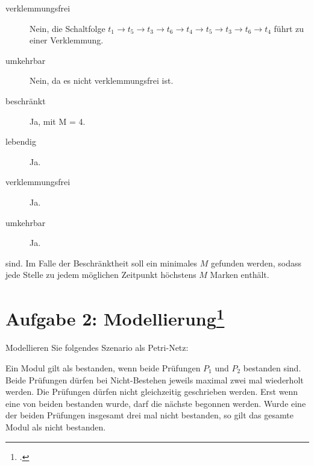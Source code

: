\documentclass{lehramt-informatik-haupt}
\begin{document}
\begin{antwort}
\begin{description}
\item[verklemmungsfrei] Nein, die Schaltfolge $t_1 \rightarrow t_5
\rightarrow t_3 \rightarrow t_6 \rightarrow t_4 \rightarrow t_5
\rightarrow t_3 \rightarrow t_6 \rightarrow t_4$ führt zu einer
Verklemmung.

\item[umkehrbar] Nein, da es nicht verklemmungsfrei ist.

\end{description}

\tikzset{/petri/.cd,x=3.3,y=4.3,scale=0.45}

\noindent
{}


\begin{description}
\item[beschränkt] Ja, mit M = 4.

\item[lebendig] Ja.

\item[verklemmungsfrei] Ja.

\item[umkehrbar] Ja.
\end{description}

\end{antwort}

\noindent
sind.
%
Im Falle der Beschränktheit soll ein minimales $M$ gefunden werden,
sodass jede Stelle zu jedem möglichen Zeitpunkt höchstens $M$ Marken
enthält.

%

\section{Aufgabe 2: Modellierung\footcite[Seite 2]{sosy:ab:4}}

Modellieren Sie folgendes Szenario als Petri-Netz:

Ein Modul gilt als bestanden, wenn beide Prüfungen $P_1$ und $P_2$
bestanden sind. Beide Prüfungen dürfen bei Nicht-Bestehen jeweils
maximal zwei mal wiederholt werden. Die Prüfungen dürfen nicht
gleichzeitig geschrieben werden. Erst wenn eine von beiden bestanden
wurde, darf die nächste begonnen werden. Wurde eine der beiden Prüfungen
insgesamt drei mal nicht bestanden, so gilt das gesamte Modul als nicht
bestanden.
\end{document}
